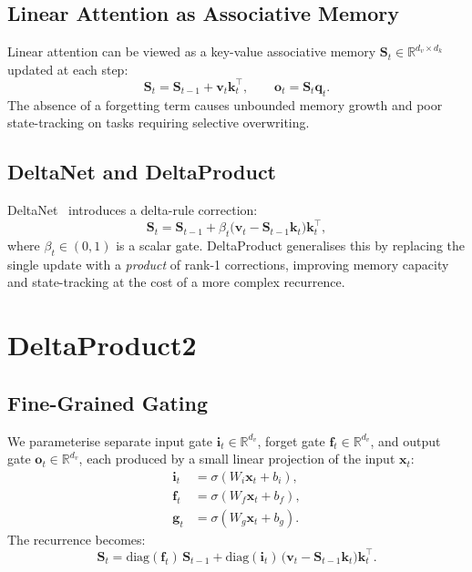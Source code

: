 \documentclass[11pt]{article}
\begin{document}
\subsection{Linear Attention as Associative Memory}

Linear attention can be viewed as a key-value associative memory
$\mathbf{S}_t \in \mathbb{R}^{d_v \times d_k}$ updated at each step:
\begin{equation}
  \mathbf{S}_t = \mathbf{S}_{t-1} + \mathbf{v}_t \mathbf{k}_t^\top, \qquad
  \mathbf{o}_t = \mathbf{S}_t \mathbf{q}_t.
\end{equation}
The absence of a forgetting term causes unbounded memory growth and
poor state-tracking on tasks requiring selective overwriting.

\subsection{DeltaNet and DeltaProduct}

DeltaNet~\cite{vaswani2017attention} introduces a delta-rule correction:
\begin{equation}
  \mathbf{S}_t = \mathbf{S}_{t-1}
    + \beta_t \bigl(\mathbf{v}_t - \mathbf{S}_{t-1}\mathbf{k}_t\bigr)\mathbf{k}_t^\top,
\end{equation}
where $\beta_t \in (0,1)$ is a scalar gate.
DeltaProduct generalises this by replacing the single update with a
\emph{product} of rank-1 corrections, improving memory capacity and
state-tracking at the cost of a more complex recurrence.

\section{DeltaProduct2}
\label{sec:method}

\subsection{Fine-Grained Gating}

We parameterise separate input gate $\mathbf{i}_t \in \mathbb{R}^{d_v}$,
forget gate $\mathbf{f}_t \in \mathbb{R}^{d_v}$, and output gate
$\mathbf{o}_t \in \mathbb{R}^{d_v}$, each produced by a small linear
projection of the input $\mathbf{x}_t$:
\begin{align}
  \mathbf{i}_t &= \sigma(W_i \mathbf{x}_t + b_i), \\
  \mathbf{f}_t &= \sigma(W_f \mathbf{x}_t + b_f), \\
  \mathbf{g}_t &= \sigma(W_g \mathbf{x}_t + b_g).
\end{align}
The recurrence becomes:
\begin{equation}
  \mathbf{S}_t = \mathrm{diag}(\mathbf{f}_t)\,\mathbf{S}_{t-1}
    + \mathrm{diag}(\mathbf{i}_t)\,
      \bigl(\mathbf{v}_t - \mathbf{S}_{t-1}\mathbf{k}_t\bigr)\mathbf{k}_t^\top.
\end{equation}
\end{document}
